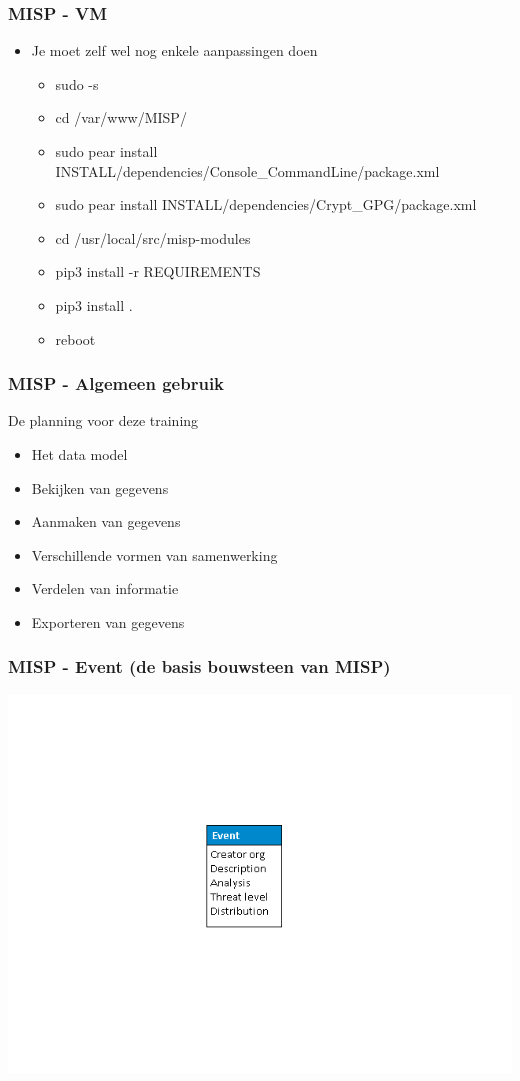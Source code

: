 \begin{frame}
    \frametitle{MISP - VM}
    \begin{itemize}
    \item Je moet zelf wel nog enkele aanpassingen doen
        \begin{itemize}
            \item sudo -s
            \item cd /var/www/MISP/
            \item sudo pear install INSTALL/dependencies/Console\_CommandLine/package.xml
            \item sudo pear install INSTALL/dependencies/Crypt\_GPG/package.xml
            \item cd /usr/local/src/misp-modules
            \item pip3 install -r REQUIREMENTS
            \item pip3 install .
            \item reboot
        \end{itemize}
    \end{itemize}
\end{frame}

\begin{frame}
    \frametitle{MISP - Algemeen gebruik}
    De planning voor deze training
        \begin{itemize}
            \item Het data model
            \item Bekijken van gegevens
            \item Aanmaken van gegevens
            \item Verschillende vormen van samenwerking
            \item Verdelen van informatie
            \item Exporteren van gegevens
        \end{itemize}
\end{frame}

\begin{frame}
    \frametitle{MISP - Event \newline (de basis bouwsteen van MISP)}
    \includegraphics[scale=0.45]{screenshots/datamodel1.png}
\end{frame}

